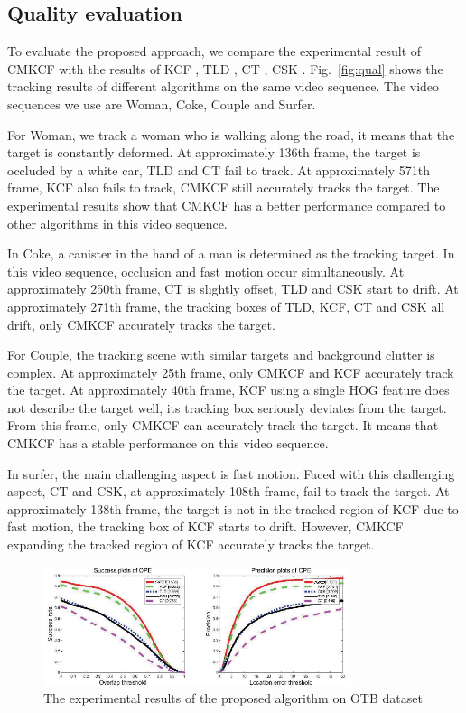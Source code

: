 \documentclass[conference]{IEEEtran}
\begin{document}
\subsection{Quality evaluation}
To evaluate the proposed approach, we compare the experimental result of CMKCF with the results of KCF \cite{KCF}, TLD \cite{TLD}, CT \cite{CT}, CSK \cite{CSK}.
Fig.~\ref{fig:qual} shows the tracking results of different algorithms on the same video sequence.
The video sequences we use are  Woman, Coke, Couple and Surfer.

For Woman, we track a woman who is walking along the road, it means that the target is constantly deformed.
At approximately 136th frame, the target is occluded by a white car, TLD and CT fail to track.
At approximately 571th frame, KCF also fails to track, CMKCF still accurately tracks the target.
The experimental results show that CMKCF has a better performance compared to other algorithms in this video sequence.

In Coke, a canister in the hand of a man is determined as the tracking target.
In this video sequence, occlusion and fast motion occur simultaneously.
At approximately 250th frame, CT is slightly offset, TLD and CSK start to drift.
At approximately 271th frame, the tracking boxes of TLD, KCF, CT and CSK all drift, only CMKCF accurately tracks the target.

For Couple, the tracking scene with similar targets and background clutter is complex.
At approximately 25th frame, only CMKCF and KCF accurately track the target.
At approximately 40th frame, KCF using a single HOG feature does not describe the target well, its tracking box seriously deviates from the target.
From this frame, only CMKCF can accurately track the target.
It means that CMKCF has a stable performance on this video sequence.

In surfer, the main challenging aspect is fast motion.
Faced with this challenging aspect, CT and CSK, at approximately 108th frame, fail to track the target.
At approximately 138th frame, the target is not in the tracked region of KCF due to fast motion, the tracking box of KCF starts to drift.
However, CMKCF expanding the tracked region of KCF accurately tracks the target.

\begin{figure}[t]
	\centering
	\includegraphics[width=9cm]{quantity.eps}
	\caption{The experimental results of the proposed algorithm on OTB dataset}
	\label{fig:quan}
\end{figure}
\end{document}
